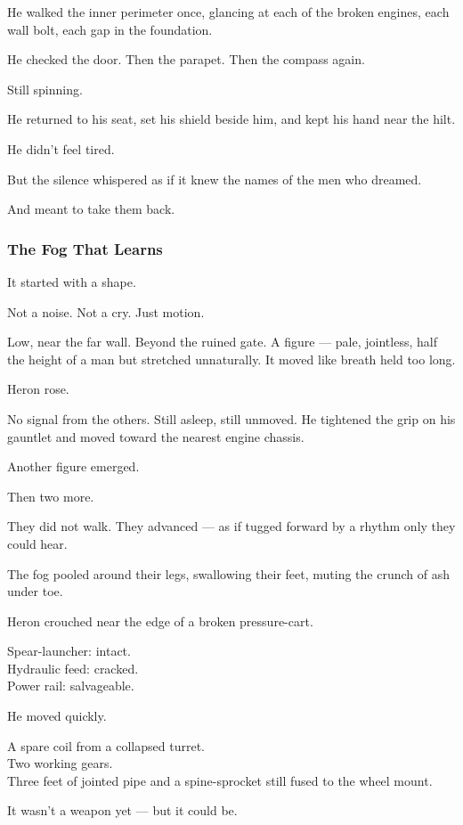 \documentclass[12pt]{article}
\begin{document}
He walked the inner perimeter once, glancing at each of the broken engines, each wall bolt, each gap in the foundation.

He checked the door. Then the parapet. Then the compass again.

Still spinning.

He returned to his seat, set his shield beside him, and kept his hand near the hilt.

He didn’t feel tired.

But the silence whispered as if it knew the names of the men who dreamed.

And meant to take them back.

\dotfill

\subsubsection{The Fog That Learns}

It started with a shape.

Not a noise. Not a cry. Just motion.

Low, near the far wall. Beyond the ruined gate. A figure — pale, jointless, half the height of a man but stretched unnaturally. It moved like breath held too long.

Heron rose.

No signal from the others. Still asleep, still unmoved. He tightened the grip on his gauntlet and moved toward the nearest engine chassis.

Another figure emerged.

Then two more.

They did not walk. They advanced — as if tugged forward by a rhythm only they could hear.

The fog pooled around their legs, swallowing their feet, muting the crunch of ash under toe.

Heron crouched near the edge of a broken pressure-cart.

Spear-launcher: intact. \\
Hydraulic feed: cracked. \\
Power rail: salvageable.

He moved quickly.

A spare coil from a collapsed turret. \\
Two working gears. \\
Three feet of jointed pipe and a spine-sprocket still fused to the wheel mount.

It wasn’t a weapon yet — but it could be.
\end{document}
